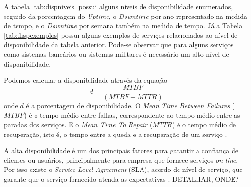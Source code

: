 A tabela \ref{tab:dispniveis} possui alguns níveis de disponibilidade enumerados, seguido da porcentagem do \textit{Uptime}, 
o \textit{Downtime} por ano representado na medida de tempo, e o \textit{Downtime} por semana também na medida de tempo. 
Já a Tabela \ref{tab:dispexemplos} possui alguns exemplos de serviços relacionados ao nível de disponibilidade da tabela anterior. 
Pode-se observar que para alguns serviços como sistemas bancários ou sistemas militares é necessário um alto nível de disponibilidade.

Podemos calcular a disponibilidade através da equação
\begin{equation}
d = \frac{MTBF}{(MTBF + MTTR)}
\label{diponibilidade}
\end{equation}
onde $d$ é a porcentagem de disponibilidade. O \textit{Mean Time Between Failures} ($MTBF$) é o tempo médio entre falhas, correspondente ao tempo médio 
entre as paradas dos serviços. E o \textit{Mean Time To Repair} ($MTTR$) é o tempo médio de recuperação, isto é, o tempo 
entre a queda e a recuperação de um serviço \cite{goncalves2009}.

A alta disponibilidade é um dos principais fatores para garantir a confiança de clientes ou usuários, principalmente para empresa que 
fornece serviços \textit{on-line}. Por isso existe o \textit{Service Level Agreement} (SLA), acordo de nível de serviço, 
que garante que o serviço fornecido atenda as expectativas \cite{smith2010}. DETALHAR, ONDE?


